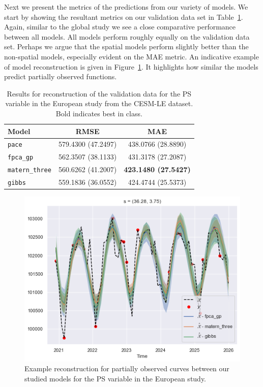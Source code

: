 Next we present the metrics of the predictions from our variety of models.
We start by showing the resultant metrics on our validation data set in Table~\ref{tab:train_cesm_ps_eur}.
Again, similar to the global study we see a close comparative performance between all models.
All models perform roughly equally on the validation data set.
Perhaps we argue that the spatial models perform slightly better than the non-spatial models, especially evident on the MAE metric.
An indicative example of model reconstruction is given in Figure~\ref{fig:train_ex_ps_eur}.
It highlights how similar the models predict partially observed functions. 

\begin{table}
	\caption[Results for PS variable on validation data in the European study]{Results for reconstruction of the validation data for the PS variable in the European study from the CESM-LE dataset. Bold indicates best in class.}
	\centering
	\label{tab:train_cesm_ps_eur}
	\begin{tabular}{lcc}
		\toprule
		\textbf{Model} & \textbf{RMSE} & \textbf{MAE} \\
		\midrule
		\verb*|pace| & 579.4300 (47.2497) & 438.0766 (28.8890) \\
		\verb*|fpca_gp| & 562.3507 (38.1133) & 431.3178 (27.2087) \\
		\verb*|matern_three| & 560.6262 (41.2007)& \textbf{423.1480 (27.5427)}\\
		\verb*|gibbs| & 559.1836 (36.0552) & 424.4744 (25.5373)\\
		\bottomrule
	\end{tabular}
\end{table}

\begin{figure}
	\centering
	\includegraphics[width=\textwidth]{train_ex_ps_eur}
	\caption{Example reconstruction for partially observed curves between our studied models for the PS variable in the European study.}
	\label{fig:train_ex_ps_eur}
\end{figure}

